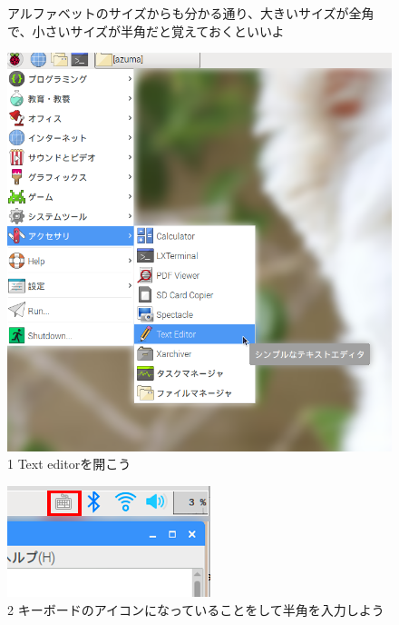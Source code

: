 \documentclass[a4paper,12pt]{jarticle}
\begin{document}
\begin{figure}[ht]
\begin{minipage}{16.578cm}
    アルファベットのサイズからも分かる通り、大きいサイズが全角で、小さいサイズが半角だと覚えておくといいよ
  \end{minipage}
  \begin{minipage}{\textwidth}
    \begin{minipage}{0.45\textwidth}
      \includegraphics[width=0.65\linewidth]{textbook-img067.png}\\
      1 Text editorを開こう
    \end{minipage}
    \begin{minipage}{2.582cm}
    \end{minipage}
    \begin{minipage}{0.45\textwidth}
      \includegraphics[width=0.75\linewidth]{textbook-img059.png}\\
      2 キーボードのアイコンになっていることをして半角を入力しよう
    \end{minipage}
  \end{minipage}


\end{figure}
\end{document}
